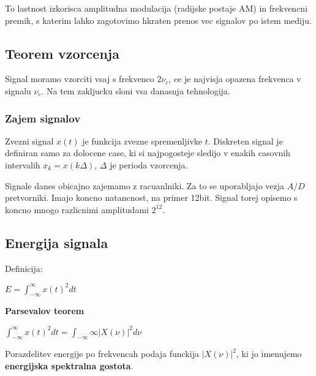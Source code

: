 \documentclass{article}
\begin{document}
\begin{multicols}{4}
To lastnost izkorisca amplitudna modulacija (radijske postaje AM) in frekvencni premik, s katerim lahko zagotovimo
hkraten prenos vec signalov po istem mediju.

\subsection{Teorem vzorcenja}
Signal moramo vzorciti vsaj s frekvenco $2 \nu_c$, ce je najvisja opazena frekvenca v signalu $\nu_c$. Na tem zakljucku
sloni vsa danasnja tehnologija.

\subsubsection{Zajem signalov}
Zvezni signal $x(t)$ je funkcija zvezne spremenljivke $t$. Diskreten signal je definiran samo za dolocene case, ki
si najpogosteje sledijo v enakih casovnih intervalih $x_k = x(k \Delta)$, $\Delta$ je perioda vzorcenja.

Signale danes obicajno zajemamo z racuanlniki. Za to se uporabljajo vezja $A/D$ pretvorniki. Imajo koncno natancnost,
na primer 12bit. Signal torej opisemo s koncno mnogo razlicnimi amplitudami $2^{12}$.

\subsection{Energija signala}
Definicija:
\begin{center}
    \begin{math}
        E = \int_{-\infty}^{\infty} x(t)^2 dt
    \end{math}
\end{center}

\textbf{Parsevalov teorem}
\begin{center}
    \begin{math}
        \int_{-\infty}^{\infty} x(t)^2 dt = \int_{-\infty}{\infty} |X(\nu)|^2 d\nu
    \end{math}
\end{center}

Porazdelitev energije po frekvencah podaja funckija $|X(\nu)|^2$, ki jo imenujemo \textbf{energijska spektralna gostota}.


\end{multicols}
\end{document}
